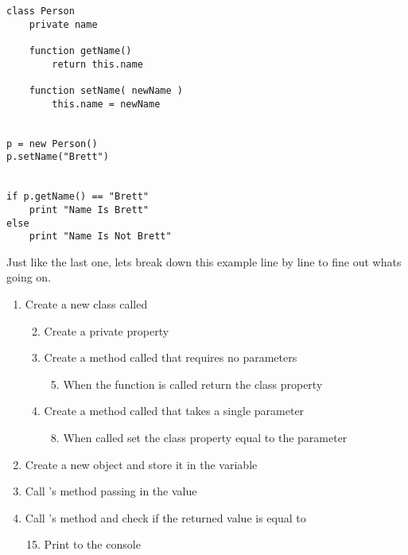 \begin{lstlisting}[caption={Example 2 - Sudo Code}]
class Person
    private name
    
    function getName()
        return this.name
    
    function setName( newName )
        this.name = newName


p = new Person()
p.setName("Brett")


if p.getName() == "Brett"
    print "Name Is Brett"
else
    print "Name Is Not Brett"
\end{lstlisting}

Just like the last one, lets break down this example line by line to fine out whats going on.

\begin{enumerate}
    \item {Create a new class called }
    \begin{enumerate}
        \setcounter{enumii}{1}
        \item {Create a private property }
        \setcounter{enumii}{3}
    
        \item {Create a method called  that requires no parameters}
        \begin{enumerate}
            \setcounter{enumiii}{4}
            \item {When the function is called return the class property }
        \end{enumerate}
        \setcounter{enumii}{6}
    
        \item {Create a method called  that takes a single parameter }
        \begin{enumerate}
            \setcounter{enumiii}{7}
            \item {When called set the class property  equal to the parameter }
        \end{enumerate}
    \end{enumerate}
    
    \setcounter{enumi}{10}
    \item {Create a new  object and store it in the variable }
    \item {Call 's  method passing in the value }
    
    \setcounter{enumi}{13}
    \item {Call 's  method and check if the returned value is equal to }
    \begin{enumerate}
        \setcounter{enumii}{14}
        \item {Print  to the console}
    \end{enumerate}
    

\end{enumerate}
